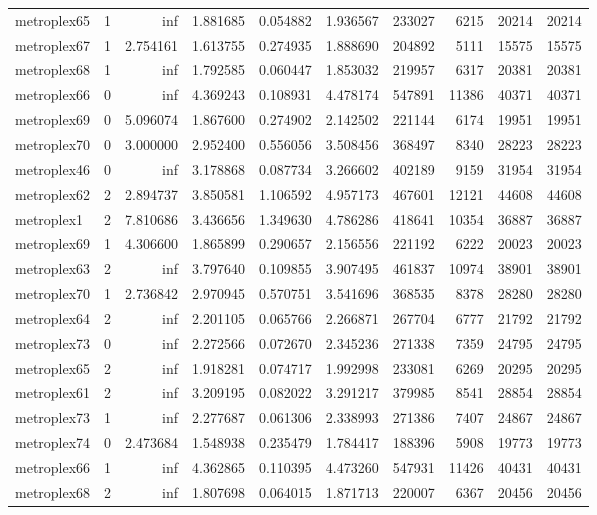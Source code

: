 \begin{longtable}{|l|r|r|r|r|r|r|r|r|r|}
metroplex65 & 1 & inf & 1.881685 & 0.054882 & 1.936567 & 233027 & 6215 & 20214 & 20214 \\
metroplex67 & 1 & 2.754161 & 1.613755 & 0.274935 & 1.888690 & 204892 & 5111 & 15575 & 15575 \\
metroplex68 & 1 & inf & 1.792585 & 0.060447 & 1.853032 & 219957 & 6317 & 20381 & 20381 \\
metroplex66 & 0 & inf & 4.369243 & 0.108931 & 4.478174 & 547891 & 11386 & 40371 & 40371 \\
metroplex69 & 0 & 5.096074 & 1.867600 & 0.274902 & 2.142502 & 221144 & 6174 & 19951 & 19951 \\
metroplex70 & 0 & 3.000000 & 2.952400 & 0.556056 & 3.508456 & 368497 & 8340 & 28223 & 28223 \\
metroplex46 & 0 & inf & 3.178868 & 0.087734 & 3.266602 & 402189 & 9159 & 31954 & 31954 \\
metroplex62 & 2 & 2.894737 & 3.850581 & 1.106592 & 4.957173 & 467601 & 12121 & 44608 & 44608 \\
metroplex1 & 2 & 7.810686 & 3.436656 & 1.349630 & 4.786286 & 418641 & 10354 & 36887 & 36887 \\
metroplex69 & 1 & 4.306600 & 1.865899 & 0.290657 & 2.156556 & 221192 & 6222 & 20023 & 20023 \\
metroplex63 & 2 & inf & 3.797640 & 0.109855 & 3.907495 & 461837 & 10974 & 38901 & 38901 \\
metroplex70 & 1 & 2.736842 & 2.970945 & 0.570751 & 3.541696 & 368535 & 8378 & 28280 & 28280 \\
metroplex64 & 2 & inf & 2.201105 & 0.065766 & 2.266871 & 267704 & 6777 & 21792 & 21792 \\
metroplex73 & 0 & inf & 2.272566 & 0.072670 & 2.345236 & 271338 & 7359 & 24795 & 24795 \\
metroplex65 & 2 & inf & 1.918281 & 0.074717 & 1.992998 & 233081 & 6269 & 20295 & 20295 \\
metroplex61 & 2 & inf & 3.209195 & 0.082022 & 3.291217 & 379985 & 8541 & 28854 & 28854 \\
metroplex73 & 1 & inf & 2.277687 & 0.061306 & 2.338993 & 271386 & 7407 & 24867 & 24867 \\
metroplex74 & 0 & 2.473684 & 1.548938 & 0.235479 & 1.784417 & 188396 & 5908 & 19773 & 19773 \\
metroplex66 & 1 & inf & 4.362865 & 0.110395 & 4.473260 & 547931 & 11426 & 40431 & 40431 \\
metroplex68 & 2 & inf & 1.807698 & 0.064015 & 1.871713 & 220007 & 6367 & 20456 & 20456 \\

\end{longtable}
